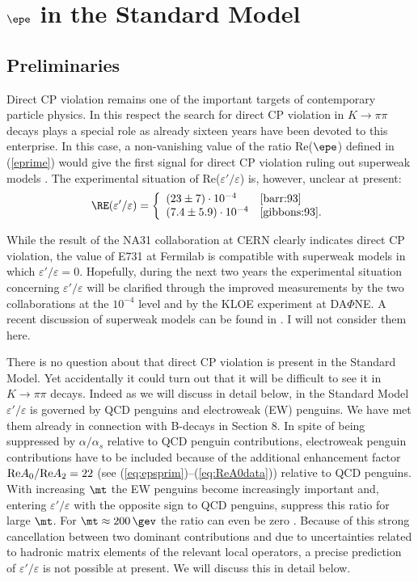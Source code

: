 \clearpage
\section{$\epe$ in the Standard Model}\label{EpsilonPrime}
\setcounter{equation}{0}
\subsection{Preliminaries}
Direct CP violation remains one of the important targets 
of contemporary particle physics. In this respect the search 
for direct CP violation in $K\to\pi\pi$ decays plays a special
role as already sixteen years have been devoted to this enterprise.
In this case,
a non-vanishing value of the ratio Re($\epe$) defined in (\ref{eprime}) 
would give the first
signal for direct CP violation ruling out superweak models
\cite{wolfenstein:64}.
The experimental situation of Re($\varepsilon'/\varepsilon$) is,
however, unclear
at present:
\begin{equation}\label{eprime1}
\RE(\varepsilon'/\varepsilon) =\left\{ \begin{array}{ll}
(23 \pm 7)\cdot 10^{-4} & \cite{barr:93} \\
(7.4 \pm 5.9)\cdot 10^{-4} & \cite{gibbons:93}.\end{array} \right.
\end{equation}

While the result of the NA31 collaboration at CERN  \cite{barr:93}
clearly indicates direct CP violation, the value of E731 at Fermilab
\cite{gibbons:93} is compatible with superweak models
 in which $\varepsilon'/\varepsilon = 0$.
 Hopefully, during the next two years the experimental situation concerning
$\varepsilon'/\varepsilon$ will be clarified through the improved
measurements by the two collaborations at the $10^{-4}$ level and by
the KLOE experiment at  DA$\Phi$NE. A recent discussion of superweak
models can be found in \cite{HALL}. I will not consider them here.

There is no question about that direct CP violation is present in
the Standard Model. Yet accidentally it could turn out that it will be
difficult to see it in $K \to \pi\pi$ decays.  Indeed as we will
discuss in detail below, in the Standard
Model $\varepsilon'/\varepsilon $ is governed by QCD penguins and
electroweak (EW) penguins. We have met them already in connection
with B-decays in Section 8. In spite of being suppressed by
$\alpha/\alpha_s$ relative to QCD penguin contributions, 
electroweak penguin contributions have to be included because of the
additional enhancement factor ${\rm Re}A_0/{\rm Re}A_2=22$ 
(see (\ref{eq:epsprim})--(\ref{eq:ReA0data})) relative
to QCD penguins. With increasing $\mt$ the EW penguins become
increasingly important \cite{flynn:89,buchallaetal:90} and, entering
$\varepsilon'/\varepsilon$ with the opposite sign to QCD penguins,
suppress this ratio for large $\mt$. For $\mt\approx 200\,\gev$ the ratio
can even be zero \cite{buchallaetal:90}.  Because of this strong
cancellation between two dominant contributions and due to uncertainties
related to hadronic matrix elements of the relevant local operators, a
precise prediction of $\varepsilon'/\varepsilon$ is not possible at
present. We will discuss this in detail below.
